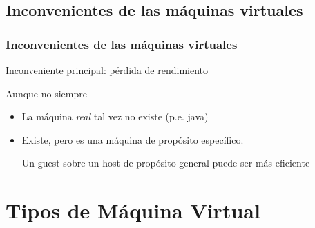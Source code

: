 \documentclass[ucs]{beamer}
\begin{document}
\subsection{Inconvenientes de las máquinas virtuales}
\begin{frame}[fragile]
\frametitle{Inconvenientes de las máquinas virtuales}

Inconveniente principal: pérdida de rendimiento

Aunque no siempre
\begin{itemize}	
\item
La máquina \emph{real} tal vez no existe (p.e. java)
\item
Existe, pero es una máquina de propósito específico.

Un guest sobre un host de propósito general puede ser
más eficiente
\end{itemize}

\end{frame}





\section{Tipos de Máquina Virtual}


%
%
\end{document}
